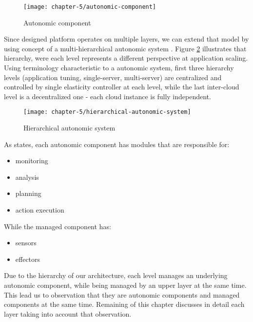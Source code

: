 \begin{figure}[!ht]
  \begin{center}
    \texttt{[image: chapter-5/autonomic-component]}
  \end{center}
  \caption{Autonomic component}
  \label{ch5:autonomic-component}
\end{figure}

Since designed platform operates on multiple layers, we can extend that model by using concept of a multi-hierarchical autonomic system \cite{LiWoZh05}. Figure \ref{ch5:hierarchical-autonomic-system} illustrates that hierarchy, were each level represents a different perspective at application scaling. Using terminology characteristic to a autonomic system, first three hierarchy levels (application tuning, single-server, multi-server) are centralized and controlled by single elasticity controller at each level, while the last inter-cloud level is a decentralized one - each cloud instance is fully independent.

\begin{figure}[!ht]
  \begin{center}
    \texttt{[image: chapter-5/hierarchical-autonomic-system]}
  \end{center}
  \caption{Hierarchical autonomic system}
  \label{ch5:hierarchical-autonomic-system}
\end{figure}

As \cite{IBM06} states, each autonomic component has modules that are responsible for:
\begin{itemize}
	\item monitoring
	\item analysis
	\item planning
	\item action execution
\end{itemize}

While the managed component has:
\begin{itemize}
	\item sensors
	\item effectors
\end{itemize}

Due to the hierarchy of our architecture, each level manages an underlying autonomic component, while being managed by an upper layer at the same time. This lead us to observation that they are autonomic components and managed components at the same time. Remaining of this chapter discusses in detail each layer taking into account that observation.


